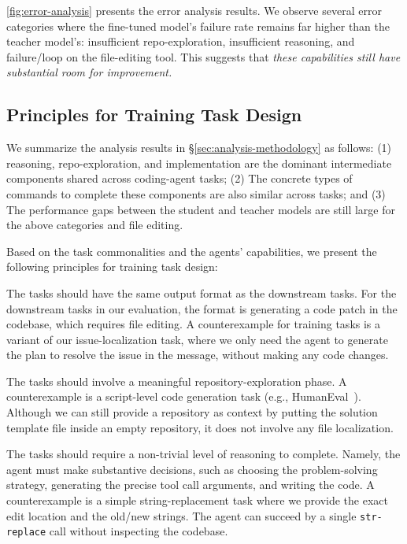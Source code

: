 \autoref{fig:error-analysis} presents the error analysis results.
We observe several error categories where the fine-tuned model’s failure rate remains far higher than the teacher model’s: insufficient repo-exploration, insufficient reasoning, and failure/loop on the file-editing tool.
This suggests that \emph{these capabilities still have substantial room for improvement.}





\subsection{Principles for Training Task Design}
\label{sec:principle}
We summarize the analysis results in \S\ref{sec:analysis-methodology} as follows:
(1) reasoning, repo-exploration, and implementation are the dominant intermediate components shared across coding-agent tasks;
(2) The concrete types of commands to complete these components are also similar across tasks; and
(3) The performance gaps between the student and teacher models are still large for the above categories and file editing.

Based on the task commonalities and the agents' capabilities, we present the following principles for training task design:

 The tasks should have the same output format as the downstream tasks.
For the downstream tasks in our evaluation, the format is generating a code patch in the codebase, which requires file editing.
A counterexample for training tasks is a variant of our issue-localization task, where we only need the agent to generate the plan to resolve the issue in the message, without making any code changes.

 The tasks should involve a meaningful repository-exploration phase. 
A counterexample is a script-level code generation task (e.g., HumanEval~\cite{codex}). 
Although we can still provide a repository as context by putting the solution template file inside an empty repository, it does not involve any file localization.

 The tasks should require a non-trivial level of reasoning to complete. Namely, the agent must make substantive decisions, such as choosing the problem-solving strategy, generating the precise tool call arguments, and writing the code.
A counterexample is a simple string-replacement task where we provide the exact edit location and the old/new strings. The agent can succeed by a single \texttt{str-replace} call without inspecting the codebase.


